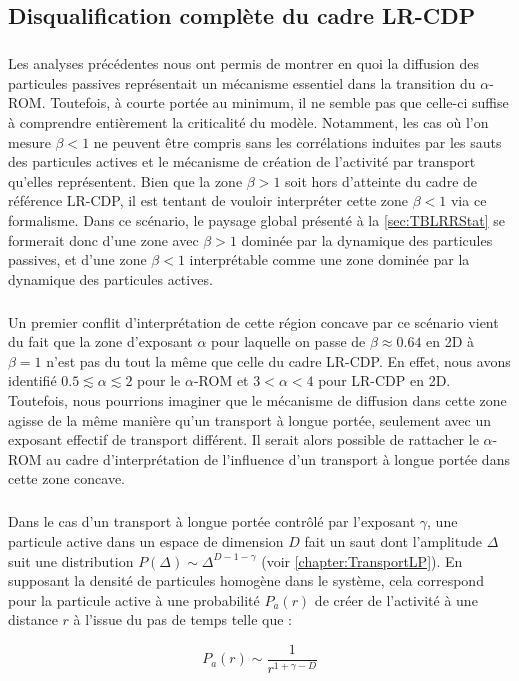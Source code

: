 \subsection{Disqualification complète du cadre LR-CDP}

\subparagraph{}Les analyses précédentes nous ont permis de montrer en quoi la diffusion des particules passives représentait un mécanisme essentiel dans la transition du $\alpha$-ROM. Toutefois, à courte portée au minimum, il ne semble pas que celle-ci suffise à comprendre entièrement la criticalité du modèle. Notamment, les cas où l'on mesure $\beta < 1$ ne peuvent être compris sans les corrélations induites par les sauts des particules actives et le mécanisme de création de l'activité par transport qu'elles représentent. Bien que la zone $\beta >1$ soit hors d'atteinte du cadre de référence LR-CDP, il est tentant de vouloir interpréter cette zone $\beta < 1$ via ce formalisme. Dans ce scénario, le paysage global présenté à la \autoref{sec:TBLRRStat} se formerait donc d'une zone avec $\beta>1$ dominée par la dynamique des particules passives, et d'une zone $\beta<1$ interprétable comme une zone dominée par la dynamique des particules actives.

\subparagraph{}Un premier conflit d'interprétation de cette région concave par ce scénario vient du fait que la zone d'exposant $\alpha$ pour laquelle on passe de $\beta\approx 0.64$ en 2D à $\beta=1$ n'est pas du tout la même que celle du cadre LR-CDP. En effet, nous avons identifié $0.5\lesssim \alpha \lesssim 2$ pour le $\alpha$-ROM et $3<\alpha<4$ pour LR-CDP en 2D. Toutefois, nous pourrions imaginer que le mécanisme de diffusion dans cette zone agisse de la même manière qu'un transport à longue portée, seulement avec un exposant effectif de transport différent. Il serait alors possible de rattacher le $\alpha$-ROM au cadre d'interprétation de l'influence d'un transport à longue portée dans cette zone concave. 

\subparagraph{}Dans le cas d'un transport à longue portée contrôlé par l'exposant $\gamma$, une particule active dans un espace de dimension $D$ fait un saut dont l'amplitude $\Delta$ suit une distribution $P(\Delta)\sim\Delta^{D-1-\gamma}$ (voir \autoref{chapter:TransportLP}). En supposant la densité de particules homogène dans le système, cela correspond pour la particule active à une probabilité $P_a(r)$ de créer de l'activité à une distance $r$ à l’issue du pas de temps telle que :

\begin{equation}
	P_a(r) \sim \frac{1}{r^{1+\gamma-D}}
\end{equation}

